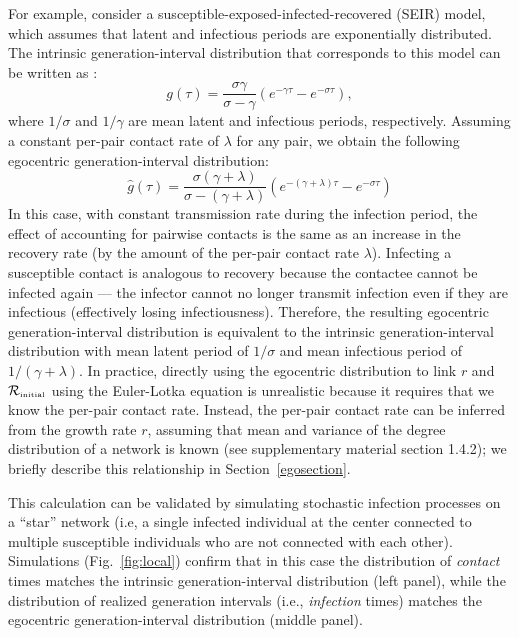 \documentclass[12pt]{article}
\newcommand{\fref}[1]{Fig.~\ref{fig:#1}}
\newcommand{\Rx}[1]{\ensuremath{{\mathcal R}_{#1}}\xspace}
\newcommand{\Rini}{\Rx{\textrm{\tiny initial}}}
\begin{document}
For example, consider a susceptible-exposed-infected-recovered (SEIR) model, which assumes that latent and infectious periods are exponentially distributed.
The intrinsic generation-interval distribution that corresponds to this model can be written as \citep{yan2008separate, Champredon2018equivalence}:
\begin{equation}
g(\tau) = \frac{\sigma \gamma}{\sigma - \gamma} \left(e^{-\gamma \tau} - e^{-\sigma \tau}\right),
\end{equation}
where $1/\sigma$ and $1/\gamma$ are mean latent and infectious periods, respectively.
Assuming a constant per-pair contact rate of $\lambda$ for any pair, we obtain the following egocentric generation-interval distribution:
\begin{equation}
\hat{g}(\tau) = \frac{\sigma (\gamma + \lambda)}{\sigma - (\gamma + \lambda)} \left(e^{-(\gamma + \lambda)\tau} - e^{-\sigma \tau}\right)
\end{equation}
In this case, with constant transmission rate during the infection period, the effect of accounting for pairwise contacts is the same as an increase in the recovery rate (by the amount of the per-pair contact rate $\lambda$). 
Infecting a susceptible contact is analogous to recovery because the contactee cannot be infected again --- the infector cannot no longer transmit infection even if they are infectious (effectively losing infectiousness).
Therefore, the resulting egocentric generation-interval distribution is equivalent to the intrinsic generation-interval distribution with mean latent period of $1/\sigma$ and mean infectious period of $1/(\gamma + \lambda)$.
In practice, directly using the egocentric distribution to link $r$ and $\Rini$ using the Euler-Lotka equation is unrealistic because it requires that we know the per-pair contact rate. 
Instead, the per-pair contact rate can be inferred from the growth rate $r$, assuming that mean and variance of the degree distribution of a network is known (see \cite{trapman2016inferring} supplementary material section 1.4.2);
we briefly describe this relationship in Section~\ref{egosection}.

This calculation can be validated by simulating stochastic infection processes on a ``star'' network (i.e, a single infected individual at the center connected to multiple susceptible individuals who are not connected with each other).
Simulations (\fref{local}) confirm that in this case the distribution of \emph{contact} times matches the intrinsic generation-interval distribution (left panel), while the distribution of realized generation intervals (i.e., \emph{infection} times) matches the egocentric generation-interval distribution (middle panel).
\end{document}
